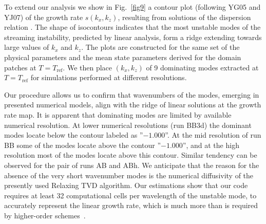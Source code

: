\par To extend our analysis we show in Fig.~\ref{fig9} a contour plot
(following YG05 and YJ07) of the growth rate  $s(k_x, k_z)$, resulting from
solutions of the dispersion relation .  The shape of
isocontours indicates that the most unstable modes of the streaming instability,
predicted by linear analysis, form a ridge extending towards  large values of
$k_x$ and $k_z$.  The plots are constructed for the same set of the physical
parameters and the mean state parameters derived for  the domain patches at $T=T
_{\textrm{ref}}$.  We then place  $(k_x, k_z)$ of 9 dominating modes extracted
at $T = T_{\textrm{ref}}$  for simulations performed at different resolutions.

Our procedure allows us to confirm that  wavenumbers  of the modes, emerging in
presented numerical models, align with the  ridge of linear solutions at the
growth rate map.  It is apparent that dominating modes  are limited by available
numerical resolution. At lower numerical resolutions (run BB3d)  the dominant
modes locate below the contour labeled as ''$-1.000$''. At the mid resolution of
run BB some of the modes locate above the contour ''$-1.000$'', and at the high
resolution most of the modes locate above this contour. Similar tendency can be
observed for the pair of runs AB and ABh.  We anticipate that the reason for the
absence of the very short wavenumber modes is the numerical diffusivity of the
presently  used Relaxing TVD algorithm. Our estimations show that  our code
requires at least 32 computational cells per wavelength of the unstable mode, to
accurately represent the linear growth rate, which is much more than is required
by higher-order schemes~\cite{YJ07, BT09}.


